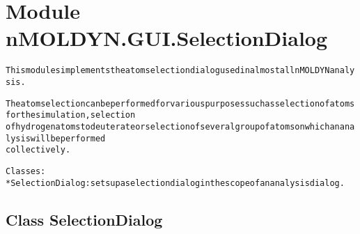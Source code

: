 %
%
%


\section{Module nMOLDYN.GUI.SelectionDialog}

    \label{nMOLDYN:GUI:SelectionDialog}
\begin{alltt}
This modules implements the atom selection dialog used in almost all nMOLDYN analysis.

The atom selection can be performed for various purposes such as selection of atoms for the simulation, selection
of hydrogen atoms to deuterate or selection of several group of atoms on which an analysis will be performed 
collectively.

Classes:
    * SelectionDialog: sets up a selection dialog in the scope of an analysis dialog.
\end{alltt}



\subsection{Class SelectionDialog}

